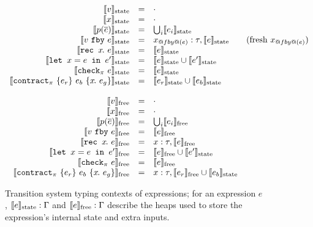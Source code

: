 
\newcommand{\sysinit}[1]{\systrans{#1}_{\text{init}}}
\newcommand{\sysvalue}[1]{\systrans{#1}_{\text{value}}}
\newcommand{\sysupdate}[1]{\systrans{#1}_{\text{update}}}
\newcommand{\sysrely}[1]{\systrans{#1}_{\text{rely}}}
\newcommand{\sysguar}[1]{\systrans{#1}_{\text{guar}}}
\newcommand{\xctr}{\xcontractP{\PStatus}{e_r}{e_b}{\rawbind{x}{e_g}}}

\newcommand{\sysstate}[1]{\systrans{#1}_{\text{state}}}
\newcommand{\sysoracle}[1]{\systrans{#1}_{\text{free}}}

\begin{figure}
  \small
  \[
  \begin{array}{rrlr}
    \sysstate{v} & = & \cdot \\
    \sysstate{x} & = & \cdot \\
    \sysstate{p(\ov{e})} & = & \bigcup_i \sysstate{e_i} \\
    \sysstate{\xfby{v}{e}} & = & x_{@fby@(e)}: \tau, \sysstate{e} & \text{(fresh $x_{@fby@(e)}$)} \\
    \sysstate{\xrec{x}{e}} & = & \sysstate{e} \\
    \sysstate{\xlet{x}{e}{e'}} & = & \sysstate{e} \cup \sysstate{e'} \\
    \sysstate{\xcheckP{\PStatus}{e}} & = & \sysstate{e} \\
    \sysstate{\xctr} & = & \sysstate{e_r} \cup \sysstate{e_b} \\
    \\
    \sysoracle{v} & = & \cdot \\
    \sysoracle{x} & = & \cdot \\
    \sysoracle{p(\ov{e})} & = & \bigcup_i \sysoracle{e_i} \\
    \sysoracle{\xfby{v}{e}} & = & \sysoracle{e} \\
    \sysoracle{\xrec{x}{e}} & = & x: \tau, \sysoracle{e} \\
    \sysoracle{\xlet{x}{e}{e'}} & = & \sysoracle{e} \cup \sysstate{e'} \\
    \sysoracle{\xcheckP{\PStatus}{e}} & = & \sysoracle{e} \\
    \sysoracle{\xctr} & = & x: \tau, \sysoracle{e_r} \cup \sysstate{e_b} \\
  \end{array}
\]
\caption{Transition system typing contexts of expressions; for an expression $e$, $\sysstate{e} : \Gamma$ and $\sysoracle{e} : \Gamma$ describe the heaps used to store the expression's internal state and extra inputs.}
\label{f:system-translation-contexts}
\end{figure}

